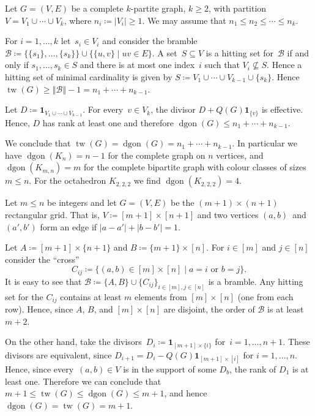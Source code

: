 \documentclass[ALCO,ThmDefs,Unicode,epreuves]{cedram}
\newcommand{\one}{\ensuremath{\mathbf{1}}}
\DeclareMathOperator{\tw}{tw}
\DeclareMathOperator{\dgon}{dgon}
\newcommand*{\B}{\mathcal{B}}
\newcommand*{\order}[1]{\left\Vert#1\right\Vert}
\begin{document}
\begin{exam}
Let $G=(V,E)$ be a complete $k$-partite graph, $k\geq 2$, with partition $V=V_1\cup\cdots\cup V_k$, where $n_i\coloneqq |V_i|\geq 1$. We may assume that $n_1\leq n_2\leq \cdots\leq n_k$. 

For $i=1,\ldots, k$ let~$s_i\in V_i$ and consider the bramble~$\B\coloneqq \{\{s_1\},\ldots,\{s_k\}\}\cup\{\{u,v\}\mid uv\in E\}$. A set~$S\subseteq V$ is a hitting set for~$\B$ if and only if $s_1,\ldots,s_k\in S$ and there is at most one index~$i$ such that $V_i\not\subseteq S$. Hence a hitting set of minimal cardinality is given by $S\coloneqq V_1\cup\cdots\cup V_{k-1}\cup\{s_k\}$. Hence $\tw(G)\geq \order{\B}-1=n_1+\cdots+n_{k-1}$.

Let $D\coloneqq \one_{V_1\cup\cdots\cup V_{k-1}}$. For every~$v\in V_k$, the divisor $D+Q(G)\one_{\{v\}}$ is effective. Hence, $D$ has rank at least one and therefore $\dgon(G)\leq n_1+\cdots+n_{k-1}$.

We conclude that $\tw(G)=\dgon(G)=n_1+\cdots+n_{k-1}$. In particular we have $\dgon(K_n)=n-1$ for the complete graph on $n$ vertices, and $\dgon(K_{m,n})=m$ for the complete bipartite graph with colour classes of sizes $m\leq n$. For the octahedron $K_{2,2,2}$ we find $\dgon(K_{2,2,2})=4$.
\end{exam}

\begin{exam}
Let $m\leq n$ be integers and let $G=(V,E)$ be the $(m+1)\times (n+1)$ rectangular grid. That is, $V\coloneqq [m+1]\times [n+1]$ and two vertices $(a,b)$~and~$(a',b')$ form an edge if $|a-a'|+|b-b'|=1$. 

Let $A\coloneqq [m+1]\times \{n+1\}$ and $B\coloneqq \{m+1\}\times [n]$. For $i\in [m]$ and $j\in [n]$ consider the ``cross'' 
\[ 
C_{ij}\coloneqq \{(a,b)\in [m]\times [n]\mid \text{$a=i$ or $b=j$}\}.
\]
It is easy to see that $\B\coloneqq \{A,B\}\cup\{C_{ij}\}_{i\in [m], j\in [n]}$ is a bramble. Any hitting set for the $C_{ij}$ contains at least $m$ elements from $[m]\times [n]$ (one from each row). Hence, since $A$, $B$, and $[m]\times [n]$ are disjoint, the order of $\B$ is at least $m+2$.

On the other hand, take the divisors~$D_i\coloneqq \one_{[m+1]\times\{i\}}$ for~$i=1,\ldots, n+1$. These divisors are equivalent, since $D_{i+1}=D_i-Q(G)\one_{[m+1]\times [i]}$ for $i=1,\ldots, n$. Hence, since every~$(a,b)\in V$ is in the support of some $D_b$, the rank of $D_1$ is at least one. Therefore we can conclude that $m+1\leq \tw(G)\leq \dgon(G)\leq m+1$, and hence $\dgon(G)=\tw(G)=m+1$. 
\end{exam}
\end{document}
